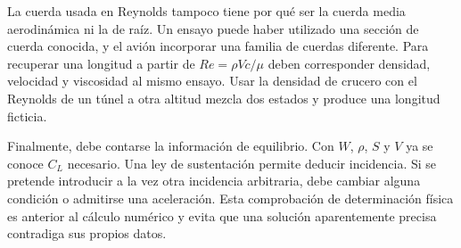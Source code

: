 La cuerda usada en Reynolds tampoco tiene por qué ser la cuerda media aerodinámica ni la de raíz. Un ensayo puede haber utilizado una sección de cuerda conocida, y el avión incorporar una familia de cuerdas diferente. Para recuperar una longitud a partir de $Re=\rho Vc/\mu$ deben corresponder densidad, velocidad y viscosidad al mismo ensayo. Usar la densidad de crucero con el Reynolds de un túnel a otra altitud mezcla dos estados y produce una longitud ficticia.

Finalmente, debe contarse la información de equilibrio. Con $W$, $\rho$, $S$ y $V$ ya se conoce $C_L$ necesario. Una ley de sustentación permite deducir incidencia. Si se pretende introducir a la vez otra incidencia arbitraria, debe cambiar alguna condición o admitirse una aceleración. Esta comprobación de determinación física es anterior al cálculo numérico y evita que una solución aparentemente precisa contradiga sus propios datos.

